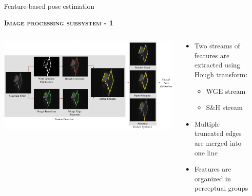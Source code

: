 \documentclass[10pt]{beamer}
\begin{document}
\begin{frame}{Feature-based pose estimation}

  \bigskip

  \textsc{\textbf{\large Image processing subsystem - 1}}

  \smallskip

  \begin{columns}[T,onlytextwidth]
    \hspace{-0.2cm}
    \begin{column}{0.5\textwidth}
      \includegraphics[height=0.4\textheight]{gfx/imageProcessingSubsystem.eps}
    \end{column}
    \hspace{1.2cm}
    \begin{column}{0.43\textwidth}
      \vspace{-0.2cm}
      {\small\begin{itemize}[label=$\rightarrow$]
          \item Two streams of features are extracted using Hough transform:
                {\footnotesize\begin{itemize}[topsep=0pt,label=-]
                  \item WGE stream
                  \item S\&H stream
                \end{itemize}}
          \item Multiple truncated edges are merged into one line
          \item Features are organized in perceptual groups
        \end{itemize}}
    \end{column}
  \end{columns}


\end{frame}
\end{document}
